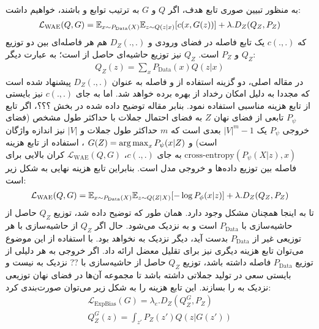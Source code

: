 \\
به منظور تبیین صوری تابع هدف، اگر $‎Q‎$  و $G$ به ترتیب توابع \encoder{} و \decoder{} باشند، خواهیم داشت:
\begin{gather}
	\mathcal{L}_{\text{WAE}}(Q, G) = \mathbb E_{x \sim P_{\text{Data}}(X)}\mathbb E_{z \sim Q(z|x)} [c(x, G(z))] + \lambda . D_ Z(Q_Z, P_Z)
\end{gather}
که $c(.,.)$ یک تابع فاصله در فضای ورودی و  $D_Z(. , .)$ هم هر فاصله‌ای بین دو توزیع $Q_Z$ و $P_Z$ است. $Q_Z$ نیز توزیع حاشیه‌ای حاصل از \encoder{} است؛ به عبارت دیگر:
\begin{gather}
	Q_Z(z) = \sum_x P_{\text{Data}}(x) Q(z|x)
\end{gather}
در مقاله اصلی، دو گزینه استفاده از \gan{} و فاصله \mmd{} به عنوان $D_Z(.,.)$ پیشنهاد شده است که مجددا به دلیل امکان رخداد \modecollapse{} از \mmd{} بهره برده خواهد شد.
اما به جای $c(.,.)$ نیز بایستی از تابع هزینه مناسبی استفاده نمود. بنابر مقاله توضیح داده شده در بخش ؟؟؟، اگر تابع $P_\psi$ تابعی از فضای نهان $Z$ به فضای احتمال جملات با حداکثر طول مشخص
(فضای خروجی $P_\psi$ یک
$|V|^m-1$
بعدی است که $m$ حداکثر طول جملات و $|V|$ نیز اندازه واژگان است) و
$G(Z) = \operatorname*{arg\,max}_{x} P_\psi(x|Z)$
، استفاده از تابع هزینه
$\text{cross-entropy}(P_\psi(X|z), x)$
به جای $c(.,.)$،
$\mathcal{L}_{\text{WAE}}(Q, G)$
کران بالایی برای فاصله \wasser{} بین توزیع داده‌ها و خروجی مدل است.
بنابراین تابع هزینه نهایی به شکل زیر است:
\begin{gather}
	\mathcal{L}_{\text{WAE}}(Q, G) = \mathbb E_{x \sim P_{\text{Data}}(X)}\mathbb E_{z \sim Q(Z|X)} [-\log P_\phi(x|z)] + \lambda . D_ Z(Q_Z, P_Z)
\end{gather}
تا به اینجا همچنان مشکل \expbias{} وجود دارد. همان طور که توضیح داده شد، توزیع $Q_Z$ حاصل از حاشیه‌سازی با $P_\text{Data}$ است و به \priordist{} نزدیک می‌شود. حال اگر $Q_Z$ از حاشیه‌سازی  با هر توزیعی غیر از $P_\text{Data}$ بدست آید، دیگر نزدیک به \priordist{} نخواهد بود. با استفاده از این موضوع می‌توان تابع هزینه دیگری نیز برای تقلیل معضل \expbias{} ارائه داد. اگر خروجی \decoder{} به هر دلیلی از توزیع $P_\text{Data}$ فاصله داشته باشد، توزیع $Q_Z$ حاصل از حاشیه‌سازی با ?? نزدیک به \priordist{} نیست و \decoder{} بایستی سعی در تولید جملاتی داشته باشد تا مجموعه آن‌ها در فضای نهان توزیعی نزدیک به \priordist{} را بسازند. این تابع هزینه را به شکل زیر می‌توان صورت‌بندی کرد:
\begin{gather}
	\mathcal{L}_\text{ExpBias}(G) = \lambda_{e} . D_ Z(Q_Z^G, P_Z)
	\\
	Q_Z^G (z) = \int_{z'} P_Z(z') Q(z|G(z'))
\end{gather}
